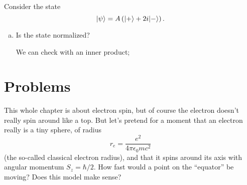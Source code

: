 \begin{example}  Consider the state 
\begin{equation}
| \psi \rangle = A \left( | + \rangle + 2i | - \rangle \right).
\end{equation}

\begin{enumerate}[(a)]
\item Is the state normalized?

We can check with an inner product; 

\end{enumerate}

\end{example}

\section*{Problems}
%

\begin{problem}
This whole chapter is about electron spin, but of course the electron doesn't really spin around like a top.  But let's pretend for a moment that an electron really is a tiny sphere, of radius
\[
r_e = \frac{e^2}{4\pi \epsilon_0 mc^2}
\]
(the so-called classical electron radius), and that it spins around its axis with angular momentum $S_z = \hbar/2$.  How fast would a point on the ``equator'' be moving?  Does this model make sense? 
\end{problem}

